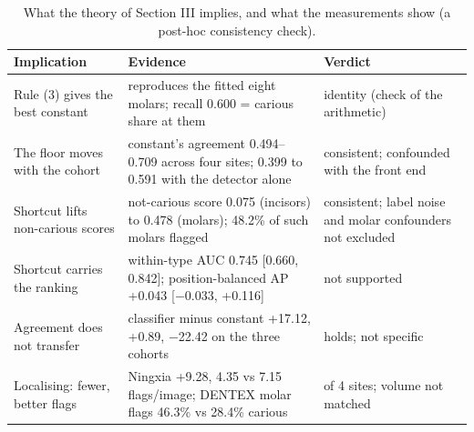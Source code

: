 \documentclass[conference]{IEEEtran}
\begin{document}
\begin{table}[t]
\centering
\caption{What the theory of Section III implies, and what the measurements show (a post-hoc consistency check).}
\label{tab:8}
\footnotesize
\setlength{\tabcolsep}{3pt}
\begin{tabular}{>{\raggedright\arraybackslash}p{3.60cm}>{\raggedright\arraybackslash}p{7.64cm}>{\raggedright\arraybackslash}p{5.50cm}}
\toprule
Implication & Evidence & Verdict \\
\midrule
Rule (3) gives the best constant & reproduces the fitted eight molars; recall 0.600 = carious share at them & identity (check of the arithmetic) \\
The floor moves with the cohort & constant's agreement 0.494–0.709 across four sites; 0.399 to 0.591 with the detector alone & consistent; confounded with the front end \\
Shortcut lifts non-carious scores & not-carious score 0.075 (incisors) to 0.478 (molars); 48.2\% of such molars flagged & consistent; label noise and molar confounders not excluded \\
Shortcut carries the ranking & within-type AUC 0.745 [0.660, 0.842]; position-balanced AP +0.043 [$-$0.033, +0.116] & not supported \\
Agreement does not transfer & classifier minus constant +17.12, +0.89, $-$22.42 on the three cohorts & holds; not specific \\
Localising: fewer, better flags & Ningxia +9.28, 4.35 vs 7.15 flags/image; DENTEX molar flags 46.3\% vs 28.4\% carious & 3 of 4 sites; volume not matched \\
\bottomrule
\end{tabular}
\end{table}
\end{document}
